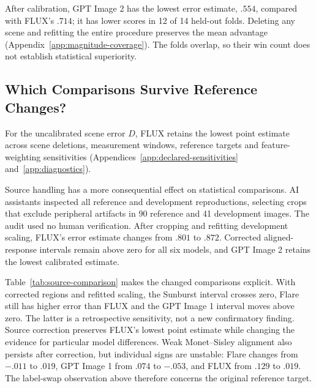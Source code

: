 After calibration, GPT Image 2 has the lowest error estimate, $.554$,
compared with FLUX's $.714$; it has lower scores in 12 of 14 held-out folds.
Deleting any scene and refitting the entire procedure preserves the mean
advantage (Appendix~\ref{app:magnitude-coverage}).
The folds overlap, so their win count does not establish statistical superiority.

\subsection{Which Comparisons Survive Reference Changes?}\label{sec:source-correction}
For the uncalibrated scene error $D$, FLUX retains the lowest point
estimate across scene deletions, measurement windows, reference targets and
feature-weighting sensitivities (Appendices~\ref{app:declared-sensitivities}
and~\ref{app:diagnostics}).

Source handling has a more consequential effect on statistical comparisons.
AI assistants inspected all reference and development reproductions, selecting
crops that exclude peripheral artifacts in 90 reference and 41 development images.
The audit used no human verification. After cropping and refitting development scaling,
FLUX's error estimate changes from $.801$ to $.872$. Corrected aligned-response
intervals remain above zero for all six models, and GPT Image 2 retains the lowest
calibrated estimate.

Table~\ref{tab:source-comparison} makes the changed comparisons explicit. With
corrected regions and refitted scaling, the Sunburst interval crosses zero,
Flare still has higher error than FLUX and the GPT Image 1 interval moves above zero. The latter
is a retrospective sensitivity, not a new confirmatory finding. Source correction
preserves FLUX's lowest point estimate while changing the evidence for particular
model differences.
Weak Monet--Sisley alignment also persists after correction, but individual
signs are unstable: Flare changes from $-.011$ to $.019$, GPT Image 1 from
$.074$ to $-.053$, and FLUX from $.129$ to $.019$. The label-swap observation
above therefore concerns the original reference target.



